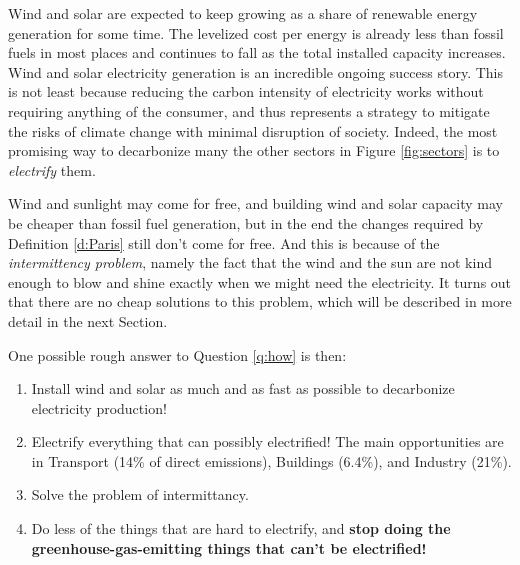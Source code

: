 Wind and solar are expected to keep growing as a share of renewable energy generation for some time. The levelized cost per energy is already less than fossil fuels in most places and continues to fall as the total installed capacity increases\cite{Bloomberg2016, Creutzig2017}. Wind and solar electricity generation is an incredible ongoing success story. This is not least because reducing the carbon intensity of electricity works without requiring anything of the consumer, and thus represents a strategy to mitigate the risks of climate change with minimal disruption of society. Indeed, the most promising way to decarbonize many the other sectors in Figure \ref{fig:sectors} is to \textit{electrify} them. 

Wind and sunlight may come for free, and building wind and solar capacity may be cheaper than fossil fuel generation, but in the end the changes required by Definition \ref{d:Paris} still don't come for free. And this is because of the \textit{intermittency problem}, namely the fact that the wind and the sun are not kind enough to blow and shine exactly when we might need the electricity. It turns out that there are no cheap solutions to this problem, which will be described in more detail in the next Section. 

One possible rough answer to Question \ref{q:how} is then:

\begin{enumerate}
	\item Install wind and solar as much and as fast as possible to decarbonize electricity production!
	
	\item Electrify everything that can possibly electrified! The main opportunities are in Transport (14\% of direct  emissions), Buildings (6.4\%), and Industry (21\%). \label{it:electrify}

	\item Solve the problem of intermittancy. \label{it:intermittant}
	
	\item Do less of the things that are hard to electrify, and \textbf{stop doing the greenhouse-gas-emitting things that can't be electrified!} \label{it:sacrifice}
\end{enumerate}

